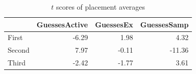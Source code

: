 
\begin{table}
\begin{tabular}{lrrr}
\toprule
{} &  GuessesActive &  GuessesEx &  GuessesSamp \\
\midrule
First  &      -6.29 &       1.98 &         4.32 \\
Second &       7.97 &      -0.11 &       -11.36 \\
Third  &      -2.42 &      -1.77 &         3.61 \\
\bottomrule
\end{tabular}
\caption{$t$ scores of placement averages}
\end{table}
